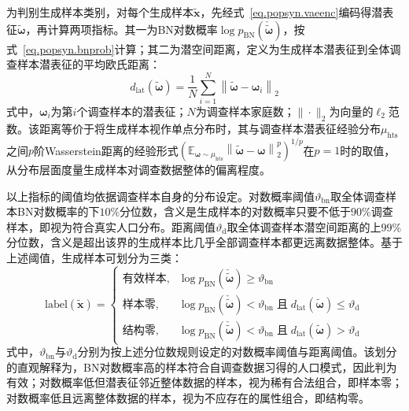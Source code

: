 为判别生成样本类别，对每个生成样本$\tilde{\mathbf{x}}$，先经式~\eqref{eq.popsyn.vaeenc}编码得潜表征$\tilde{\boldsymbol{\omega}}$，再计算两项指标。其一为BN对数概率$\log p_{\mathrm{BN}}(\check{\tilde{\boldsymbol{\omega}}})$，按式~\eqref{eq.popsyn.bnprob}计算；其二为潜空间距离，定义为生成样本潜表征到全体调查样本潜表征的平均欧氏距离：
\begin{equation}
  d_{\mathrm{lat}}\left(\tilde{\boldsymbol{\omega}}\right) = \frac{1}{N} \sum_{i=1}^{N} \left\| \tilde{\boldsymbol{\omega}} - \boldsymbol{\omega}_i \right\|_2
  \label{eq.popsyn.latdist}
\end{equation}
式中，$\boldsymbol{\omega}_i$为第$i$个调查样本的潜表征；$N$为调查样本家庭数；$\|\cdot\|_2$为向量的$\ell_2$范数。该距离等价于将生成样本视作单点分布时，其与调查样本潜表征经验分布$\mu_{\mathrm{hts}}$之间$p$阶Wasserstein距离的经验形式$\left(\mathbb{E}_{\boldsymbol{\omega} \sim \mu_{\mathrm{hts}}} \left\| \tilde{\boldsymbol{\omega}} - \boldsymbol{\omega} \right\|_2^{p}\right)^{1/p}$在$p = 1$时的取值，从分布层面度量生成样本对调查数据整体的偏离程度。
 
以上指标的阈值均依据调查样本自身的分布设定。对数概率阈值$\vartheta_{\mathrm{bn}}$取全体调查样本BN对数概率的下$10\%$分位数，含义是生成样本的对数概率只要不低于$90\%$调查样本，即视为符合真实人口分布。距离阈值$\vartheta_{\mathrm{d}}$取全体调查样本潜空间距离的上$99\%$分位数，含义是超出该界的生成样本比几乎全部调查样本都更远离数据整体。基于上述阈值，生成样本可划分为三类：
\begin{equation}
  \mathrm{label}\left(\tilde{\mathbf{x}}\right) =
  \begin{cases}
    \text{有效样本}, & \log p_{\mathrm{BN}}\left(\check{\tilde{\boldsymbol{\omega}}}\right) \geq \vartheta_{\mathrm{bn}} \\[2pt]
    \text{样本零}, & \log p_{\mathrm{BN}}\left(\check{\tilde{\boldsymbol{\omega}}}\right) < \vartheta_{\mathrm{bn}} \;\text{且}\; d_{\mathrm{lat}}\left(\tilde{\boldsymbol{\omega}}\right) \leq \vartheta_{\mathrm{d}} \\[2pt]
    \text{结构零}, & \log p_{\mathrm{BN}}\left(\check{\tilde{\boldsymbol{\omega}}}\right) < \vartheta_{\mathrm{bn}} \;\text{且}\; d_{\mathrm{lat}}\left(\tilde{\boldsymbol{\omega}}\right) > \vartheta_{\mathrm{d}}
  \end{cases}
  \label{eq.popsyn.zeroclass}
\end{equation}
式中，$\vartheta_{\mathrm{bn}}$与$\vartheta_{\mathrm{d}}$分别为按上述分位数规则设定的对数概率阈值与距离阈值。该划分的直观解释为，BN对数概率高的样本符合自调查数据习得的人口模式，因此判为有效；对数概率低但潜表征邻近整体数据的样本，视为稀有合法组合，即样本零；对数概率低且远离整体数据的样本，视为不应存在的属性组合，即结构零。
 
